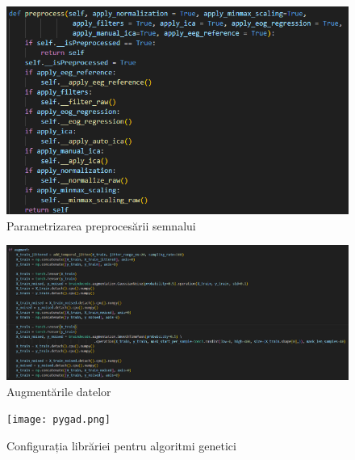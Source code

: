 \begin{figure}
    \centering
    \includegraphics[width=1\linewidth]{images/parametrizare.png}
    \caption{Parametrizarea preprocesării semnalui}
    \label{fig:parametrizare}
\end{figure}

\begin{figure}
    \centering
    \includegraphics[width=1\linewidth]{images/augmentari.png}
    \caption{Augmentările datelor}
    \label{fig:augmentari}
\end{figure}

\begin{figure}
    \centering
    \texttt{[image: pygad.png]}
    \caption{Configurația librăriei pentru algoritmi genetici}
    \label{fig:pygad_configuration}
\end{figure}